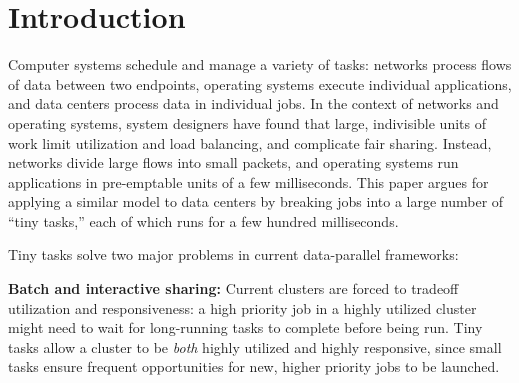 \section{Introduction}
Computer systems schedule and manage a variety of tasks:
networks process flows of data
between two endpoints, operating systems execute individual applications, and
data centers process data in individual jobs.  In the context of networks and
operating systems, system designers have found that large, indivisible units of work limit utilization and load balancing,
and complicate fair sharing.  Instead, networks divide large flows into small
packets, and operating systems run applications in pre-emptable units of a
few milliseconds.  This paper argues for
applying a similar model to data centers by breaking jobs into
a large number of ``tiny tasks,'' each of which runs for a few hundred
milliseconds.

Tiny tasks solve two major problems in current data-parallel frameworks:

\vspace{4pt}\noindent\textbf{Batch and interactive sharing:}
Current clusters are forced to tradeoff utilization and responsiveness:
a high priority job in a highly utilized cluster might
need to wait for long-running tasks to complete before being run.
Tiny tasks allow a cluster to be \emph{both} highly utilized and highly
responsive, since small tasks ensure frequent opportunities for new,
higher priority jobs to be launched.


